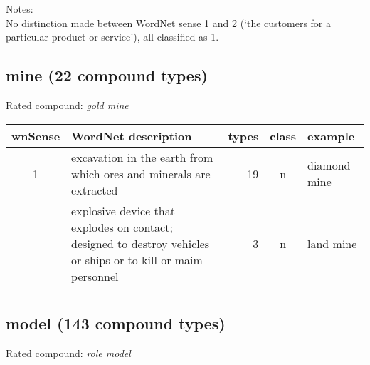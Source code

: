 \noindent
Notes:\\
No distinction made between WordNet sense 1 and 2 (`the customers for a particular product or service'), all classified as 1.
\subsection{mine      (22 compound types)}
Rated compound: \emph{gold mine}


\noindent
\begin{longtable}{c>{\raggedright\arraybackslash}p{5cm}rc>{\raggedright\arraybackslash}p{2cm}}\lsptoprule
{\small wnSense}&WordNet description&types&class&example\\\midrule
1&excavation in the earth from which ores and minerals are extracted&19&n&diamond mine\\\tablevspace
2&explosive device that explodes on contact; designed to destroy vehicles or ships or to kill or maim personnel&3&n&land mine\\\lspbottomrule
\end{longtable}
\subsection{model    (143 compound types)}
Rated compound: \emph{role model}



